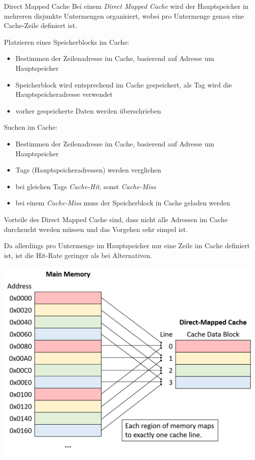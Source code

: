 \begin{defi}{Direct Mapped Cache}
  Bei einem \emph{Direct Mapped Cache} wird der Hauptspeicher in mehreren disjunkte Untermengen organisiert, wobei pro Untermenge genau eine Cache-Zeile definiert ist.

  Platzieren eines Speicherblocks im Cache:
  \begin{itemize}
    \item Bestimmen der Zeilenadresse im Cache, basierend auf Adresse um Hauptspeicher
    \item Speicherblock wird entsprechend im Cache gespeichert, als Tag wird die Hauptspeicheradresse verwendet
    \item vorher gespeicherte Daten werden überschrieben
  \end{itemize}

  Suchen im Cache:
  \begin{itemize}
    \item Bestimmen der Zeilenadresse im Cache, basierend auf Adresse um Hauptspeicher
    \item Tags (Hauptspeicheradressen) werden verglichen
    \item bei gleichen Tags \emph{Cache-Hit}, sonst \emph{Cache-Miss}
    \item bei einem \emph{Cache-Miss} muss der Speicherblock in Cache geladen werden
  \end{itemize}

  Vorteile des Direct Mapped Cache sind, dass nicht alle Adressen im Cache durchsucht werden müssen und das Vorgehen sehr simpel ist.

  Da allerdings pro Untermenge im Hauptspeicher nur eine Zeile im Cache definiert ist, ist die Hit-Rate geringer als bei Alternativen.

  \centering
  \includegraphics[width=.6\linewidth]{images/direct_mapped_cache.png}
\end{defi}

